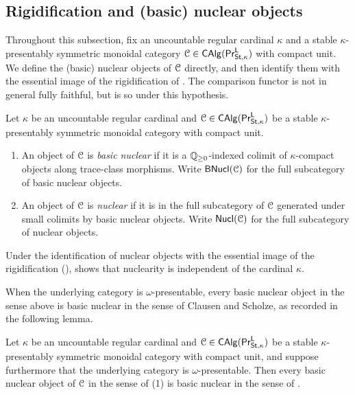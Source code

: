 \subsection{Rigidification and (basic) nuclear objects}\label{subsec: rigidification and basic nuclear objects}
Throughout this subsection, fix an uncountable regular cardinal $\kappa$ and a stable $\kappa$-presentably symmetric monoidal category $\EuScript{C}\in\mathsf{CAlg}(\mathsf{Pr}^{\mathsf{L}}_{\mathsf{St},\kappa})$ with compact unit. We define the (basic) nuclear objects of $\EuScript{C}$ directly, and then identify them with the essential image of the rigidification of \cite{RamziLocRigid}. The comparison functor is not in general fully faithful, but is so under this hypothesis.  
\begin{definition}\label{def: basic nuclear in category}
    Let $\kappa$ be an uncountable regular cardinal and $\EuScript{C}\in\mathsf{CAlg}(\mathsf{Pr}^{\mathsf{L}}_{\mathsf{St},\kappa})$ be a stable $\kappa$-presentably symmetric monoidal category with compact unit.
    \begin{enumerate}
        \item An object of $\EuScript{C}$ is \emph{basic nuclear} if it is a $\mathbb{Q}_{\geq0}$-indexed colimit of $\kappa$-compact objects along trace-class morphisms. Write $\mathsf{BNucl}(\EuScript{C})$ for the full subcategory of basic nuclear objects.  
        \item An object of $\EuScript{C}$ is \emph{nuclear} if it is in the full subcategory of $\EuScript{C}$ generated under small colimits by basic nuclear objects. Write $\mathsf{Nucl}(\EuScript{C})$ for the full subcategory of nuclear objects. 
    \end{enumerate}
\end{definition}
\begin{remark}\label{rmk: nuclear is kappa-independent}
    Under the identification of nuclear objects with the essential image of the rigidification (), \cite[Thm. 4.81]{RamziLocRigid} shows that nuclearity is independent of the cardinal $\kappa$. 
\end{remark}
When the underlying category is $\omega$-presentable, every basic nuclear object in the sense above is basic nuclear in the sense of Clausen and Scholze, as recorded in the following lemma.
\begin{lemma}\label{lem: CS nuclear comparison}
    Let $\kappa$ be an uncountable regular cardinal and $\EuScript{C}\in\mathsf{CAlg}(\mathsf{Pr}^{\mathsf{L}}_{\mathsf{St},\kappa})$ be a stable $\kappa$-presentably symmetric monoidal category with compact unit, and suppose furthermore that the underlying category is $\omega$-presentable. Then every basic nuclear object of $\EuScript{C}$ in the sense of  (1) is basic nuclear in the sense of \cite[Def. 8.5]{Complex}.
\end{lemma}
